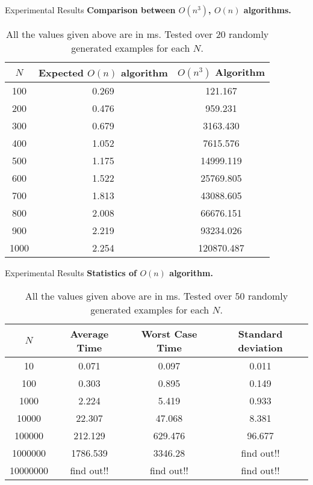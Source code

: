 \documentclass{beamer}
\begin{document}
\begin{frame}{Experimental Results}
\textbf{Comparison between $O(n^3)$, $O(n)$ algorithms.}
\begin{table}
\centering
\begin{tabular}{|c| c |c |} 
 \hline\hline
 $N$ & Expected $O(n)$ algorithm & $O(n^3)$ Algorithm \\ [0.5ex] 
 \hline\hline
100 & 0.269 & 121.167 \\ \hline
200 & 0.476  & 959.231\\ \hline

300 & 0.679 & 3163.430
 \\ \hline

400 & 1.052 & 7615.576
 \\ \hline

500 & 1.175 & 14999.119
 \\ \hline

600 & 1.522 & 25769.805
 \\ \hline

700 & 1.813 & 43088.605
\\ \hline

800 & 2.008 & 66676.151
\\ \hline

900 & 2.219 & 93234.026
 \\ \hline

1000 & 2.254 & 120870.487
\\ \hline
\end{tabular}
\caption{All the values given above are in ms. Tested over $20$ randomly generated examples for each $N$.}
\end{table}
\end{frame}

\begin{frame}{Experimental Results}
\textbf{Statistics of $O(n)$ algorithm.}
\begin{table}
\centering
\begin{tabular}{|c| c |c |c|} 
 \hline\hline
 $N$ & Average Time & Worst Case Time & Standard deviation \\ [0.5ex] 
 \hline\hline
10 & 0.071 & 0.097  & 0.011
 \\ \hline
100 & 0.303 & 0.895 & 0.149
 \\ \hline
1000 & 2.224 & 5.419 & 0.933
 \\ \hline
10000 & 22.307 & 47.068 & 8.381
 \\ \hline
100000 & 212.129 & 629.476 & 96.677
 \\ \hline
1000000 & 1786.539 & 3346.28 & find out!!
 \\ \hline
 10000000 & find out!! & find out!! & find out!!
 \\ \hline
\end{tabular}
\caption{All the values given above are in ms. Tested over $50$ randomly generated examples for each $N$.}\end{table}
\end{frame}
\end{document}

